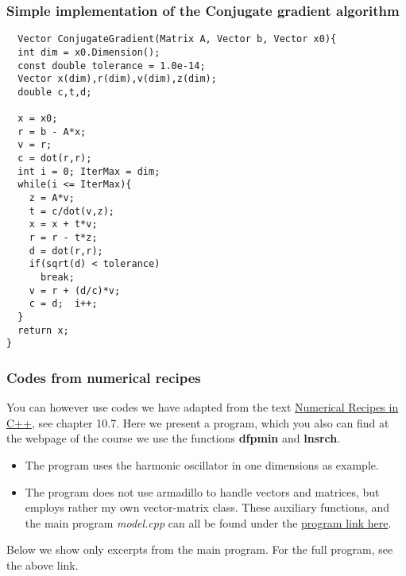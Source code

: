 \documentclass{beamer}
\begin{document}
\begin{frame}
\frametitle{Simple implementation of the Conjugate gradient algorithm}

\begin{block}{}
\begin{verbatim}
  Vector ConjugateGradient(Matrix A, Vector b, Vector x0){
  int dim = x0.Dimension();
  const double tolerance = 1.0e-14;
  Vector x(dim),r(dim),v(dim),z(dim);
  double c,t,d;

  x = x0;
  r = b - A*x;
  v = r;
  c = dot(r,r);
  int i = 0; IterMax = dim;
  while(i <= IterMax){
    z = A*v;
    t = c/dot(v,z);
    x = x + t*v;
    r = r - t*z;
    d = dot(r,r);
    if(sqrt(d) < tolerance)
      break;
    v = r + (d/c)*v;
    c = d;  i++;
  }
  return x;
} 
\end{verbatim}
\end{block}
\end{frame}

\begin{frame}
\frametitle{Codes from numerical recipes}

\begin{block}{}
You can however use codes we have adapted from the text \href{{http://www.nr.com/}}{Numerical Recipes in C++}, see chapter 10.7.  
Here we present a program, which you also can find at the webpage of the course we use the functions \textbf{dfpmin} and \textbf{lnsrch}.  

\begin{itemize}
\item The program uses the harmonic oscillator in one dimensions as example.

\item The program does not use armadillo to handle vectors and matrices, but employs rather my own vector-matrix class. These auxiliary functions, and the main program \emph{model.cpp} can all be found under the \href{{https://github.com/CompPhysics/ComputationalPhysics2/tree/gh-pages/doc/pub/cg/programs/c%
\end{itemize}

\noindent
Below we show only excerpts from the main program. For the full program, see the above link.
\end{block}
\end{frame}
\end{document}
